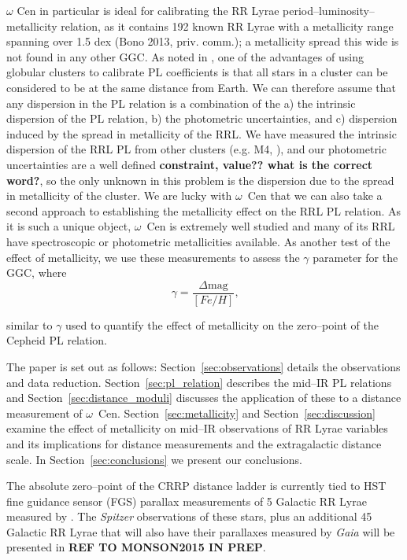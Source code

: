 $\omega$ Cen in particular is ideal for calibrating the RR Lyrae period--luminosity--metallicity relation, as it contains 192 known RR Lyrae \citep{2004A&A...424.1101K} with a metallicity range spanning over 1.5 dex (Bono 2013, priv. comm.); a metallicity spread this wide is not found in any other GGC. As noted in \citet{2006MNRAS.372.1675S}, one of the advantages of using globular clusters to calibrate PL coefficients is that all stars in a cluster can be considered to be at the same distance from Earth. We can therefore assume that any dispersion in the PL relation is a combination of the a) the intrinsic dispersion of the PL relation, b) the photometric uncertainties, and c) dispersion induced by the spread in metallicity of the RRL. We have measured the intrinsic dispersion of the RRL PL from other clusters (e.g. M4, \citet{2015arXiv150507858N}), and our photometric uncertainties are a well defined \textbf{constraint, value?? what is the correct word?}, so the only unknown in this problem is the dispersion due to the spread in metallicity of the cluster. We are lucky with $\omega$~Cen that we can also take a second approach to establishing the metallicity effect on the RRL PL relation. As it is such a unique object, $\omega$~Cen is extremely well studied and many of its RRL have spectroscopic or photometric metallicities available. As another test of the effect of metallicity, we use these measurements to assess the $\gamma$ parameter for the GGC, where 
\begin{equation} \label{eqn:gamma}
\gamma = \dfrac {\Delta \text{mag}} {[Fe/H]}\text{,}
\end{equation}

similar to $\gamma$ used to quantify the effect of metallicity on the zero--point of the Cepheid PL relation. 

The paper is set out as follows: Section~\ref{sec:observations} details the observations and data reduction. Section~\ref{sec:pl_relation} describes the mid--IR PL relations and Section~\ref{sec:distance_moduli} discusses the application of these to a distance measurement of  $\omega$~Cen. Section~\ref{sec:metallicity} and Section~\ref{sec:discussion} examine the effect of metallicity on mid--IR observations of RR Lyrae variables and its implications for distance measurements and the extragalactic distance scale. In Section~\ref{sec:conclusions} we present our conclusions.


The absolute zero--point of the CRRP distance ladder is currently tied to HST fine guidance sensor (FGS) parallax measurements of 5 Galactic RR Lyrae measured by \citet{2011AJ....142..187B}. The {\it Spitzer} observations of these stars, plus an additional 45 Galactic RR Lyrae that will also have their parallaxes measured by {\it Gaia} will be presented in \citet{Monson2015} {\bf REF TO MONSON2015 IN PREP}. 


